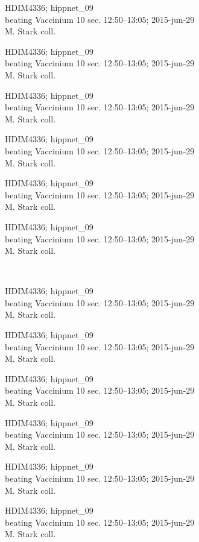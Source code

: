 \documentclass[2pt]{extarticle}
\begin{document}
\noindent
\parbox{0.16\textwidth}{\tiny \raggedright \rule[-0.3\baselineskip]{0pt}{10pt}HDIM4336; hippnet\_09\\ beating Vaccinium 10 sec. 12:50--13:05; 2015-jun-29\\ M. Stark coll.}
\parbox{0.16\textwidth}{\tiny \raggedright \rule[-0.3\baselineskip]{0pt}{10pt}HDIM4336; hippnet\_09\\ beating Vaccinium 10 sec. 12:50--13:05; 2015-jun-29\\ M. Stark coll.}
\parbox{0.16\textwidth}{\tiny \raggedright \rule[-0.3\baselineskip]{0pt}{10pt}HDIM4336; hippnet\_09\\ beating Vaccinium 10 sec. 12:50--13:05; 2015-jun-29\\ M. Stark coll.}
\parbox{0.16\textwidth}{\tiny \raggedright \rule[-0.3\baselineskip]{0pt}{10pt}HDIM4336; hippnet\_09\\ beating Vaccinium 10 sec. 12:50--13:05; 2015-jun-29\\ M. Stark coll.}
\parbox{0.16\textwidth}{\tiny \raggedright \rule[-0.3\baselineskip]{0pt}{10pt}HDIM4336; hippnet\_09\\ beating Vaccinium 10 sec. 12:50--13:05; 2015-jun-29\\ M. Stark coll.}
\parbox{0.16\textwidth}{\tiny \raggedright \rule[-0.3\baselineskip]{0pt}{10pt}HDIM4336; hippnet\_09\\ beating Vaccinium 10 sec. 12:50--13:05; 2015-jun-29\\ M. Stark coll.} \\ 
\vspace{0.001in} 

\noindent
\parbox{0.16\textwidth}{\tiny \raggedright \rule[-0.3\baselineskip]{0pt}{10pt}HDIM4336; hippnet\_09\\ beating Vaccinium 10 sec. 12:50--13:05; 2015-jun-29\\ M. Stark coll.}
\parbox{0.16\textwidth}{\tiny \raggedright \rule[-0.3\baselineskip]{0pt}{10pt}HDIM4336; hippnet\_09\\ beating Vaccinium 10 sec. 12:50--13:05; 2015-jun-29\\ M. Stark coll.}
\parbox{0.16\textwidth}{\tiny \raggedright \rule[-0.3\baselineskip]{0pt}{10pt}HDIM4336; hippnet\_09\\ beating Vaccinium 10 sec. 12:50--13:05; 2015-jun-29\\ M. Stark coll.}
\parbox{0.16\textwidth}{\tiny \raggedright \rule[-0.3\baselineskip]{0pt}{10pt}HDIM4336; hippnet\_09\\ beating Vaccinium 10 sec. 12:50--13:05; 2015-jun-29\\ M. Stark coll.}
\parbox{0.16\textwidth}{\tiny \raggedright \rule[-0.3\baselineskip]{0pt}{10pt}HDIM4336; hippnet\_09\\ beating Vaccinium 10 sec. 12:50--13:05; 2015-jun-29\\ M. Stark coll.}
\parbox{0.16\textwidth}{\tiny \raggedright \rule[-0.3\baselineskip]{0pt}{10pt}HDIM4336; hippnet\_09\\ beating Vaccinium 10 sec. 12:50--13:05; 2015-jun-29\\ M. Stark coll.} \\ 
\vspace{0.001in} 
\end{document}
